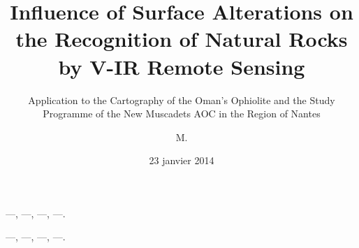 \documentclass[12pt, french, fancyChapter, fancyPart, squeezeCommittee]{these-LUNAM}
\title{Influence of Surface Alterations on the Recognition of Natural Rocks by V-IR Remote Sensing}
\subtitle{Application to the Cartography of the Oman's Ophiolite and the Study Programme of the New Muscadets AOC in the Region of Nantes}
\author{M.}{Jean}{Duteil de la Jousselinière}
\date{23 janvier 2014}
\begin{document}
\begin{resume}
   \footnotesize
   \lipsum[1-2]
\end{resume}

\begin{motscles}
   ---, ---, ---, ---.
\end{motscles}

\begin{abstract}
   \footnotesize
   \lipsum[1-1]
\end{abstract}

\begin{keywords}
   ---, ---, ---, ---.
\end{keywords}

\maketitle

\end{document}
